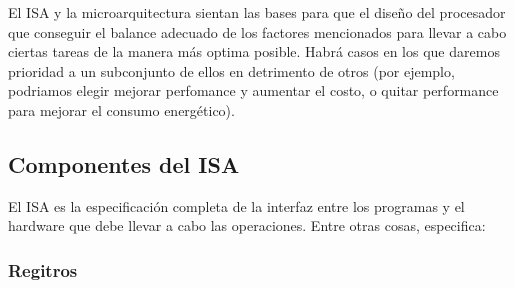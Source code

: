 El ISA y la microarquitectura sientan las bases para que el diseño del procesador que conseguir el balance adecuado de los factores mencionados para llevar a cabo ciertas tareas de la manera más optima posible. Habrá casos en los que daremos prioridad a un subconjunto de ellos en detrimento de otros (por ejemplo, podriamos elegir mejorar perfomance y aumentar el costo, o quitar performance para mejorar el consumo energético).

\subsection{Componentes del ISA}
El ISA es la especificación completa de la interfaz entre los programas y el hardware que debe llevar a cabo las operaciones. Entre otras cosas, especifica:

\subsubsection{Regitros}
